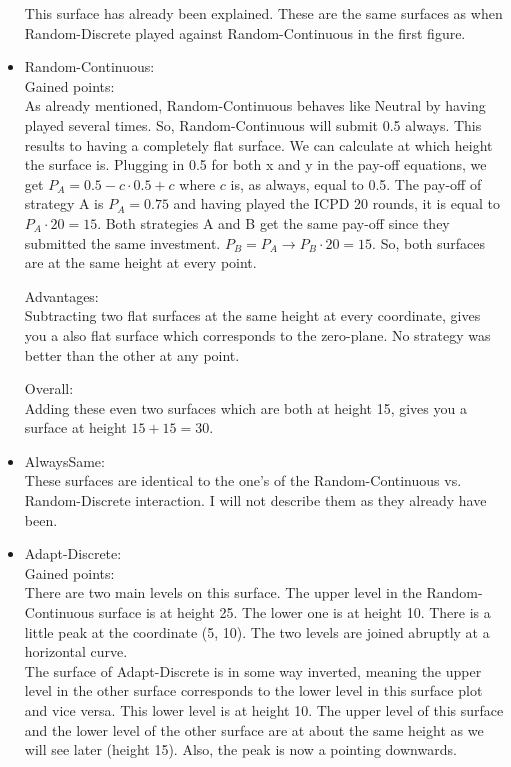 \documentclass{article}
\begin{document}
\begin{itemize}
		This surface has already been explained.
		These are the same surfaces as when Random-Discrete played against Random-Continuous in the first figure.
	
	\item Random-Continuous:\\

		Gained points:\\
			As already mentioned, Random-Continuous behaves like Neutral by having played several times.
			So, Random-Continuous will submit 0.5 always.
			This results to having a completely flat surface.
			We can calculate at which height the surface is.
			Plugging in 0.5 for both x and y in the pay-off equations, we get $P_A = 0.5 - c \cdot 0.5 + c$ where $c$ is, as always, equal to 0.5.
			The pay-off of strategy A is $P_A = 0.75$ and having played the ICPD 20 rounds, it is equal to $P_A \cdot 20 = 15$.
			Both strategies A and B get the same pay-off since they submitted the same investment.
			$P_B = P_A \rightarrow P_B \cdot 20 = 15$.
			So, both surfaces are at the same height at every point.

		Advantages:\\
			Subtracting two flat surfaces at the same height at every coordinate, gives you a also flat surface which corresponds to the zero-plane.
			No strategy was better than the other at any point.

		Overall:\\
			Adding these even two surfaces which are both at height 15, gives you a surface at height $15 + 15 = 30$.

	\item AlwaysSame:\\

		These surfaces are identical to the one's of the Random-Continuous vs. Random-Discrete interaction.
		I will not describe them as they already have been.
	
	\item Adapt-Discrete:\\

		Gained points:\\
			There are two main levels on this surface.
			The upper level in the Random-Continuous surface is at height 25.
			The lower one is at height 10.
			There is a little peak at the coordinate (5, 10).
			The two levels are joined abruptly at a horizontal curve.\\
			The surface of Adapt-Discrete is in some way inverted, meaning the upper level in the other surface corresponds to the lower level in this surface plot and vice versa.
			This lower level is at height 10.
			The upper level of this surface and the lower level of the other surface are at about the same height as we will see later (height 15).
			Also, the peak is now a pointing downwards.


\end{itemize}
\end{document}
